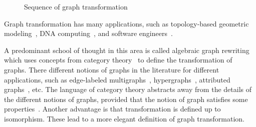\begin{figure}[!htbp]
{
}
        \caption{Sequence of graph transformation}
        \label{fig:intro_sequence_of_transformation}
    \end{figure}

 Graph transformation has many applications, such as topology-based geometric modeling~\cite{poudret2007topology, belhaouari2014jerboa, bellet2017geometric, pascale2022Geometric_modeling}, DNA computing~\cite{harju2004tutorial_dna_computation}, and software engineers~\cite{heckel2020software_engineers}.
 
 A predominant school of thought in this area is called algebraic graph rewriting~\cite{ehrig1997handbook1,ehrig1999handbook2,ehrig1999handbook3} which uses concepts from category theory~\cite{pierce1991basic,barr1990category,maclane2013categories} to define the transformation of graphs. There different notions of graphs in the literature for different applications, such as edge-labeled multigraphs~\cite{konig2018atutorial,corradini1997algebraic}, hypergraphs~\cite{plump1993hypergraph}, attributed graphs~\cite{ehrig2006fundamentals}, etc. 
 The language of category theory abstracts away from the details of the different notions of graphs, provided that the notion of graph satisfies some properties~\cite{lack2004adhesive,overbeek2023graph}. 
 Another advantage is that transformation is defined up to isomorphism. 
 These lead to a more elegant definition of graph transformation.


